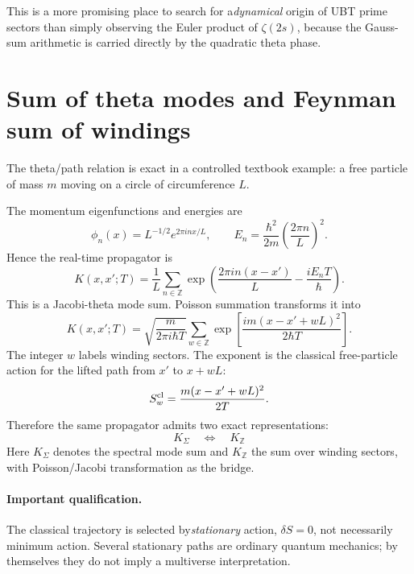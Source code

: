This is a more promising place to search for a\emph{dynamical} origin of UBT prime
sectors than simply observing the Euler product of $\zeta(2s)$, because the Gauss-sum
arithmetic is carried directly by the quadratic theta phase.

\section{Sum of theta modes and Feynman sum of windings}
\label{sec:theta-feynman}

The theta/path relation is exact in a controlled textbook example: a free particle of
mass $m$ moving on a circle of circumference $L$.

The momentum eigenfunctions and energies are
\begin{equation}
 \phi_n(x)=L^{-1/2}e^{2\pi i n x/L},
 \qquad
 E_n=\frac{\hbar^2}{2m}\left(\frac{2\pi n}{L}\right)^2.
\end{equation}
Hence the real-time propagator is
\begin{equation}
 K(x,x';T)
 =\frac1L\sum_{n\in\mathbb Z}
 \exp\!\left(\frac{2\pi i n(x-x')}{L}
             -\frac{iE_nT}{\hbar}\right).
 \label{eq:circle-mode-propagator}
\end{equation}
This is a Jacobi-theta mode sum.  Poisson summation transforms it into
\begin{equation}
 \boxed{
 K(x,x';T)
 =\sqrt{\frac{m}{2\pi i\hbar T}}
  \sum_{w\in\mathbb Z}
  \exp\!\left[
   \frac{i m(x-x'+wL)^2}{2\hbar T}
  \right].}
 \label{eq:circle-winding-propagator}
\end{equation}
The integer $w$ labels winding sectors.  The exponent is the classical free-particle
action for the lifted path from $x'$ to $x+wL$:
\begin{equation}
 S_w^{\rm cl}=\frac{m(x-x'+wL)^2}{2T}.
\end{equation}
Therefore the same propagator admits two exact representations:
\begin{equation}
 \boxed{
 K_\Sigma
 \quad\Longleftrightarrow\quad
 K_{\mathbb Z}}
 \label{eq:mode-winding-duality}
\end{equation}
Here $K_\Sigma$ denotes the spectral mode sum and $K_{\mathbb Z}$ the sum over
winding sectors,
with Poisson/Jacobi transformation as the bridge.

\paragraph{Important qualification.}
The classical trajectory is selected by\emph{stationary} action,
$\delta S=0$, not necessarily minimum action.  Several stationary paths are ordinary
quantum mechanics; by themselves they do not imply a multiverse interpretation.

